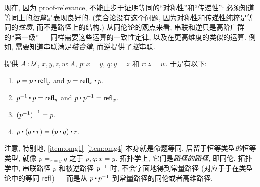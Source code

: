 现在, 因为 proof-relevance, 不能止步于证明等同的``对称性''和``传递性'': 必须知道等同上的\emph{运算}是表现良好的.
(集合论没有这个问题, 因为对称性和传递性纯粹是等同的\emph{性质}, 而不是路径上的结构.)
从同伦论的观点来看, 串联和逆只是高阶广群的``第一级'' --- 同样需要这些运算的一致性定律, 以及在更高维度的类似的运算.
例如, 需要知道串联满足\emph{结合律}, 而逆提供了\emph{逆}串联.

\begin{lem}
    \label{thm:omg}%
    提供 $A:\mathcal{U}$, $x,y,z,w:A$, $p:x= y$, $q:y = z$ 和 $r:z=w$.
    于是有以下:
    \begin{enumerate}
        \item $p= p\ct \refl{y}$ and $p = \refl{x} \ct p$.\label{item:omg1}
        \item $\opp{p}\ct p= \refl{y}$ and $p\ct \opp{p}= \refl{x}$.\label{item:omg2}
        \item $\mathord{{(\mathord{{p}^{-1}})}^{-1}}= p$.\label{item:omg3}
        \item $p\ct (q\ct r)= (p\ct q)\ct r$.\label{item:omg4}
    \end{enumerate}
\end{lem}

注意, 特别地, \ref{item:omg1}--\ref{item:omg4} 本身就是命题等同, 居留于恒等类型\emph{的}恒等类型, 就像 $p=_{x=y}q$ 之于 $p,q:x=y$.
拓扑学上, 它们是\emph{路径的路径}, 即同伦.
拓扑学中, 串联路径 $p$ 和被逆路径 $\mathord{{p}^{-1}}$ 时, 不会字面地得到常量路径 (对应于于在类型论中的等同 $\mathsf{refl}_{}$) --- 而是从 $p\ct\opp p$ 到常量路径的同伦或者高维路径.

